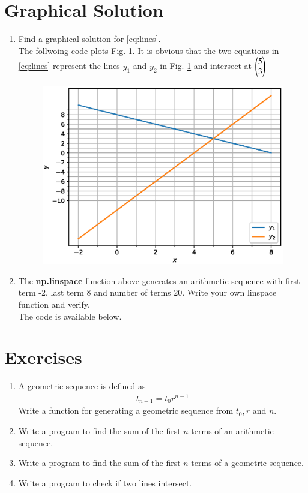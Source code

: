 \documentclass[journal,12pt,twocolumn]{IEEEtran}
\renewcommand\thesection{\arabic{section}}
\begin{document}
\section{Graphical Solution}
\begin{enumerate}[label=\thesection.\arabic*
,ref=\thesection.\theenumi]
\item Find a graphical solution for \eqref{eq:lines}.
\label{prob:graph}
\\
\solution The follwoing code plots Fig. \ref{fig:draw_line}.  It is obvious that the two equations in 
\eqref{eq:lines} represent the lines $y_1$ and $y_2$ in Fig. \ref{fig:draw_line} and intersect at $\begin{pmatrix}5 
\\3\end{pmatrix}$

%
\begin{figure}
\centering
\includegraphics[width=\columnwidth]{./figs/draw_line.eps}
\caption{}
\label{fig:draw_line}
\end{figure}
\item The \textbf{np.linspace} function above generates an arithmetic sequence with first term -2, last term 8 
and 
number of terms 20.  Write your own linspace function and verify.
\\
\solution The code is available below.

\end{enumerate}
\section{Exercises}
\begin{enumerate}[label=\thesection.\arabic*
,ref=\thesection.\theenumi]
\item A geometric sequence is defined as
\begin{align}
\label{eq:geo}
t_{n-1} = t_0r^{n-1}
\end{align}
Write a function for generating a geometric sequence from $t_0, r$ and $n$.
\item Write a program to find the sum of the first  $n$ terms of an arithmetic sequence.
\item Write a program to find the sum of the first  $n$ terms of a geometric sequence.
\item Write a program to check if two lines intersect.
\end{enumerate}
\end{document}
